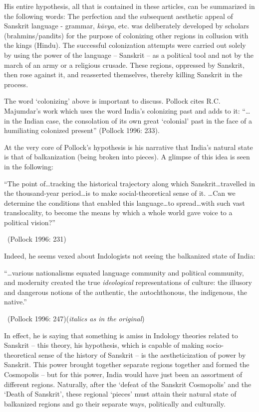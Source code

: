 His entire hypothesis, all that is contained in these articles, can be summarized in the following words: The perfection and the subsequent aesthetic appeal of Sanskrit language - grammar, \textit{kāvya}, etc. was deliberately developed by scholars (brahmins/pandits) for the purpose of colonizing other regions in collusion with the kings (Hindu). The successful colonization attempts were carried out solely by using the power of the language – Sanskrit – as a political tool and not by the march of an army or a religious crusade. These regions, oppressed by Sanskrit, then rose against it, and reasserted themselves, thereby killing Sanskrit in the process.

The word ‘colonizing’ above is important to discuss. Pollock cites R.C. Majumdar’s work which uses the word India’s colonizing past and adds to it: “…in the Indian case, the consolation of its own great ‘colonial’ past in the face of a humiliating colonized present” (Pollock 1996: 233).

At the very core of Pollock’s hypothesis is his narrative that India’s natural state is that of balkanization (being broken into pieces). A glimpse of this idea is seen in the following:

\begin{myquote}
“The point of…tracking the historical trajectory along which Sanskrit…\-travelled in the thousand-year period…is to make social-theoretical sense of it. …Can we determine the conditions that enabled this language…to spread…with such vast translocality, to become the means by which a whole world gave voice to a political vision?” 

~\hfill (Pollock 1996: 231)
\end{myquote}

Indeed, he seems vexed about Indologists not seeing the balkanized state of India:

\begin{myquote}
“…various nationalisms equated language community and political community, and modernity created the true \textit{ideological} representations of culture: the illusory and dangerous notions of the authentic, the autochthonous, the indigenous, the native.” 

~\hfill (Pollock 1996: 247)(\textit{italics as in the original})
\end{myquote}

In effect, he is saying that something is amiss in Indology theories related to Sanskrit – this theory, his hypothesis, which is capable of making socio-theoretical sense of the history of Sanskrit – is the aestheticization of power by Sanskrit. This power brought together separate regions together and formed the Cosmopolis – but for this power, India would have just been an assortment of different regions. Naturally, after the ‘defeat of the Sanskrit Cosmopolis’ and the ‘Death of Sanskrit’, these regional ‘pieces’ must attain their natural state of balkanized regions and go their separate ways, politically and culturally.

